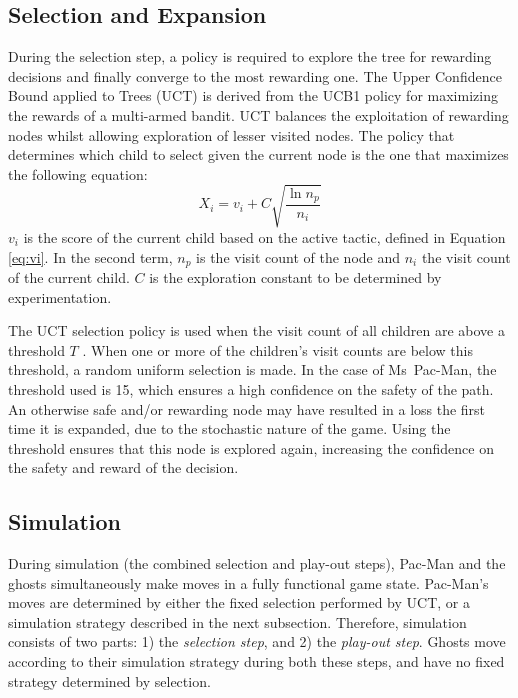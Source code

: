 \documentclass[journal]{IEEEtran}
\begin{document}
\subsection{Selection and Expansion}
\label{uct}
During the selection step, a policy is required to explore the tree for rewarding decisions and finally converge to the most rewarding one. The Upper Confidence Bound applied to Trees (UCT) \cite{kocsis2006bandit} is derived from the UCB1 policy \cite{auer2002using} for maximizing the rewards of a multi-armed bandit. UCT balances the exploitation of rewarding nodes whilst allowing exploration of lesser visited nodes. The policy that determines which child to select given the current node is the one that maximizes the following equation:
\begin{equation}
\label{eq:uct}
X_i = v_i + C \sqrt{ \frac{\ln{n_p}}{n_i}}
\end{equation}
$v_i$ is the score of the current child based on the active tactic, defined in Equation \ref{eq:vi}. In the second term, $n_p$ is the visit count of the node and $n_i$ the visit count of the current child. $C$ is the exploration constant to be determined by experimentation.

The UCT selection policy is used when the visit count of all children are above a threshold $T$ \cite{coulom2007efficient}. When one or more of the children's visit counts are below this threshold, a random uniform selection is made. In the case of Ms~Pac-Man, the threshold used is 15, which ensures a high confidence on the safety of the path. An otherwise safe and/or rewarding node may have resulted in a loss the first time it is expanded, due to the stochastic nature of the game. Using the threshold ensures that this node is explored again, increasing the confidence on the safety and reward of the decision.

\subsection{Simulation}
\label{simulation}
During simulation (the combined selection and play-out steps), Pac-Man and the ghosts simultaneously make moves in a fully functional game state. Pac-Man's moves are determined by either the fixed selection performed by UCT, or a simulation strategy described in the next subsection. Therefore, simulation consists of two parts: 1) the \emph{selection step}, and 2) the \emph{play-out step}. Ghosts move according to their simulation strategy during both these steps, and have no fixed strategy determined by selection.
\end{document}
